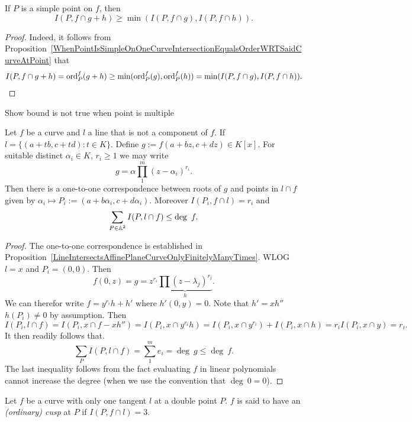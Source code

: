     \begin{proposition}
        If $P$ is a simple point on $f$, then 
        $$I(P,f\cap g+h)\geq \min(I(P,f\cap g),I(P,f\cap h)).$$
    \end{proposition}
    \begin{proof}
        Indeed, it follows from Proposition~\ref{WhenPointIsSimpleOnOneCurveIntersectionEqualsOrderWRTSaidCurveAtPoint} that 
        \begin{align*}
            I(P,f\cap g+h)= \mathrm{ord}_P^f(g+h)\geq \min(\mathrm{ord}_P^f(g),\mathrm{ord}_P^f(h))= \min(I(P,f\cap g),I(P,f\cap h)).
        \end{align*}
    \end{proof}
    \begin{example}
        {\Large Show bound is not true when point is multiple} 
    \end{example}
    \begin{proposition}
        Let $f$ be a curve and $l$ a line that is not a component of $f$. If $l=\{(a+tb,c+td) : t\in K\}$. Define $g:=f(a+bz,c+dz)\in K[x]$. For suitable distinct $\alpha_i\in K$, $r_i\geq 1$ we may write 
        $$g=\alpha \prod_1^m (z-\alpha_i)^{r_i}.$$
        Then there is a one-to-one correspondence between roots of $g$ and points in $l\cap f$ given by $\alpha_i\mapsto P_i:=(a+b\alpha_i,c+d\alpha_i)$. Moreover $I(P_i, f\cap l) = r_i$ and $$\sum_{P\in \mathbb{A}^2} I(P,l\cap f) \leq \deg \ f. $$ 
    \end{proposition}
    \begin{proof}
        The one-to-one correspondence is established in Proposition~\ref{LineIntersectsAffinePlaneCurveOnlyFinitelyManyTimes}. 
        WLOG $l = x$ and $P_i = (0,0)$. Then 
        $$f(0,z)=g=z^{r_i}\underbrace{\prod (z-\lambda_j)^{r_j}}_h.$$ We can therefor write $f= y^{r_i}h+h'$ where $h'(0,y)=0$. Note that $h'=xh''$ $h(P_i)\neq0$ by assumption. Then  
        $$I(P_i, l\cap f)= I(P_i, x \cap f- xh'') = I(P_i,x\cap y^{r_i}h)=I(P_i,x\cap y^{r_i})+I(P_i,x\cap h)=r_iI(P_i,x\cap y)=r_i.$$
        It then readily follows that. 
        $$\sum_P I(P,l\cap f)=\sum_1^m e_i = \deg\ g\leq \deg \ f.$$
        The last inequality follows from the fact evaluating $f$ in linear polynomials cannot increase the degree (when we use the convention that $\deg \ 0 = 0$). 
    \end{proof}
    \begin{definition}
        Let $f$ be a curve with only one tangent $l$ at a double point $P$. $f$ is said to have an \textit{(ordinary) cusp} at $P$ if $I(P,f\cap l)=3$.
    \end{definition}
